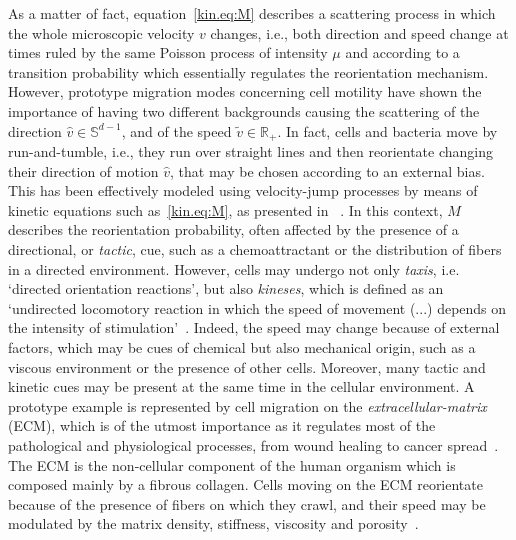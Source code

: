 \documentclass[a4paper]{article}
\theoremstyle{Theorem}\newtheorem{proposition}{Proposition}[section]
\theoremstyle{Remark}\newtheorem{remark}{Remark}[section]
\theoremstyle{Theorem}\newtheorem{theorem}{Theorem}[section]
\newcommand{\R}{\mathbb{R}}
\newcommand{\hv}{\hat{v}}
\newcommand{\tv}{\tilde{v}}
\begin{document}
As a matter of fact, equation~\eqref{kin.eq:M} describes a scattering process in which the whole microscopic velocity $v$ changes, i.e., both direction and speed change at times ruled by the same Poisson process of intensity $\mu$ and according to a transition probability which essentially regulates the reorientation mechanism. However, prototype migration modes concerning cell motility have shown the importance of having two different backgrounds causing the scattering of the direction  $\hv \in \mathbb{S}^{d-1}$, and of the speed $\tv \in \R_+$.  In fact, cells and bacteria move by run-and-tumble, i.e., they run over straight lines and then reorientate changing their direction of motion $\hv$, that may be chosen according to an external bias.  This has been effectively modeled using velocity-jump processes by means of kinetic equations such as~\eqref{kin.eq:M}, as presented in ~\cite{stroock1974ZWVG,hillen2006JMB,calvez2015KRM,Filbet_Perthame}. In this context, $M$ describes the reorientation probability, often affected by the presence of a directional, or \textit{tactic}, cue, such as a chemoattractant or the distribution of fibers in a directed environment. However, cells may undergo not only \textit{taxis}, i.e. `directed orientation reactions', but also \textit{kineses}, which is defined as an `undirected locomotory reaction  in which the speed of movement (...) depends on the intensity of
stimulation'~\cite{Doucet1990}. Indeed, the speed may change because of external factors, which may be cues of chemical but also mechanical origin, such as a viscous environment or the presence of other cells. Moreover, many tactic and kinetic cues may be present at the same time in the cellular environment. A prototype example is represented by cell migration on the \textit{extracellular-matrix} (ECM), which is of the utmost importance as it regulates most of the pathological and physiological processes, from wound healing to cancer spread~\cite{Taufalele2019PLOSONE,provenzano2008collagen}. The ECM is the non-cellular component of the human organism which is composed mainly by a fibrous collagen. %
Cells moving on the ECM reorientate because of the presence of fibers on which they crawl, and their speed may be modulated by the matrix density, stiffness, viscosity and porosity~\cite{charras2014nat}.
\end{document}
